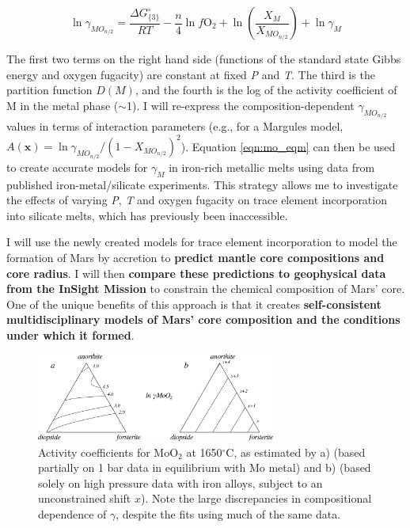\documentclass[11pt,twoside,a4paper]{article}
\begin{document}
\begin{equation}
  \ln \gamma_{MO_{n/2}}  = \frac{\Delta G^{\circ}_{\{3\}}}{RT} - \frac{n}{4} \ln f\textrm{O}_2 + \ln \left( \frac{X_M}{X_{MO_{n/2}}} \right) + \ln \gamma_M
  \label{eqn:mo_eqm}
\end{equation}

The first two terms on the right hand side (functions of the standard state Gibbs energy and oxygen fugacity) are constant at fixed \emph{P} and \emph{T}. The third is the partition function $D(M)$, and the fourth is the log of the activity coefficient of M in the metal phase ($\sim$1). I will re-express the composition-dependent $\gamma_{MO_{n/2}}$ values in terms of interaction parameters (e.g., for a Margules model, $A(\mathbf{x}) = \ln \gamma_{MO_{n/2}} / (1-X_{MO_{n/2}})^2$). Equation \ref{eqn:mo_eqm} can then be used to create accurate models for $\gamma_M$ in iron-rich metallic melts using data from published iron-metal/silicate experiments. This strategy allows me to investigate the effects of varying \emph{P}, \emph{T} and oxygen fugacity on trace element incorporation into silicate melts, which has previously been inaccessible. %

I will use the newly created models for trace element incorporation to model the formation of Mars by accretion \citep[e.g.][]{WW2005} to \textbf{predict mantle core compositions and core radius}. I will then \textbf{compare these predictions to geophysical data from the InSight Mission} \citep[see WP3;][]{BBPSR2015} to constrain the chemical composition of Mars' core. One of the unique benefits of this approach is that it creates \textbf{self-consistent multidisciplinary models of Mars' core composition and the conditions under which it formed}.

\begin{figure}[!ht]
  \centering
  \includegraphics[width=0.7\textwidth]{figures/Mo_partitioning}
  \caption{Activity coefficients for MoO$_2$ at 1650$^{\circ}$C, as estimated by a) \cite{WW2013} (based partially on 1 bar data in equilibrium with Mo metal) and b) \cite{RC2011} (based solely on high pressure data with iron alloys, subject to an unconstrained shift $x$). Note the large discrepancies in compositional dependence of $\gamma$, despite the fits using much of the same data.}
  \label{fig:expt_gammas}
\end{figure} 
\end{document}
